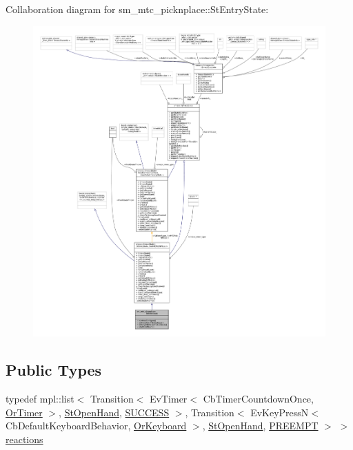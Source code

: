 Collaboration diagram for sm\+\_\+mtc\+\_\+picknplace\+:\+:St\+Entry\+State\+:
\nopagebreak
\begin{figure}[H]
\begin{center}
\leavevmode
\includegraphics[width=350pt]{structsm__mtc__picknplace_1_1StEntryState__coll__graph}
\end{center}
\end{figure}
\subsection*{Public Types}
\begin{DoxyCompactItemize}
\item 
typedef mpl\+::list$<$ Transition$<$ Ev\+Timer$<$ Cb\+Timer\+Countdown\+Once, \hyperlink{classsm__mtc__picknplace_1_1OrTimer}{Or\+Timer} $>$, \hyperlink{structsm__mtc__picknplace_1_1StOpenHand}{St\+Open\+Hand}, \hyperlink{classSUCCESS}{S\+U\+C\+C\+E\+SS} $>$, Transition$<$ Ev\+Key\+PressN$<$ Cb\+Default\+Keyboard\+Behavior, \hyperlink{classsm__mtc__picknplace_1_1OrKeyboard}{Or\+Keyboard} $>$, \hyperlink{structsm__mtc__picknplace_1_1StOpenHand}{St\+Open\+Hand}, \hyperlink{classPREEMPT}{P\+R\+E\+E\+M\+PT} $>$ $>$ \hyperlink{structsm__mtc__picknplace_1_1StEntryState_ac751a269a130ccadc026892a4e0face5}{reactions}
\end{DoxyCompactItemize}
